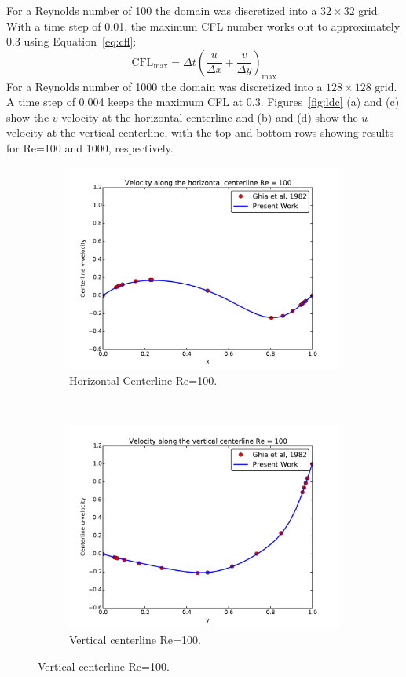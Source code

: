 For a Reynolds number of 100 the domain was discretized into a $32\times32$ grid. 
With a time step of 0.01, the maximum CFL number works out to approximately 0.3 using Equation~\eqref{eq:cfl}:
\begin{equation}
\text{CFL}_{\text{max}}=\Delta t\left(\frac{u}{\Delta x}+\frac{v}{\Delta y}\right)_{\text{max}}
\label{eq:cfl}
\end{equation}
For a Reynolds number of 1000 the domain was discretized into a $128\times128$ grid. 
A time step of 0.004 keeps the maximum CFL at 0.3. 
Figures~\ref{fig:ldc} (a) and (c) show the $v$ velocity at the horizontal centerline and (b) and (d) show the $u$ velocity at the vertical centerline, with the top and bottom rows showing results for Re=100 and 1000, respectively. 
\begin{figure}[!htb]
	\centering
	\begin{subfigure}{0.4\textwidth}
		\includegraphics[width=\linewidth]{ldc_horizontal_100}
		\caption{Horizontal Centerline Re=100.}		
	\end{subfigure}
	~
	\begin{subfigure}{0.4\textwidth}
		\includegraphics[width=\linewidth]{ldc_vertical_100}
		\caption{Vertical centerline Re=100.}		
	\end{subfigure}
	

\end{figure}
